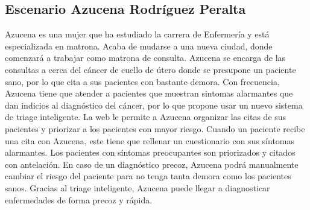 \subsection{Escenario Azucena Rodríguez Peralta}
Azucena es una mujer que ha estudiado la carrera de Enfermería y está especializada en matrona.
Acaba de mudarse a una nueva ciudad, donde comenzará a trabajar como matrona de consulta. Azucena se encarga
de las consultas a cerca del cáncer de cuello de útero donde se presupone un paciente sano, por lo que cita
a sus pacientes con bastante demora. Con frecuencia, Azucena tiene que atender a pacientes que muestran sintomas
alarmantes que dan indicios al diagnóstico del cáncer, por lo que propone usar un nuevo sistema de triage inteligente.
La web le permite a Azucena organizar las citas de sus pacientes y priorizar a los pacientes con mayor riesgo.
Cuando un paciente recibe una cita con Azucena, este tiene que rellenar un cuestionario con sus síntomas alarmantes.
Los pacientes con síntomas preocupantes son priorizados y citados con antelación. En caso de un diagnóstico precoz,
Azucena podrá manualmente cambiar el riesgo del paciente para no tenga tanta demora como los pacientes sanos.
Gracias al triage inteligente, Azucena puede llegar a diagnosticar enfermedades de forma precoz y rápida.
